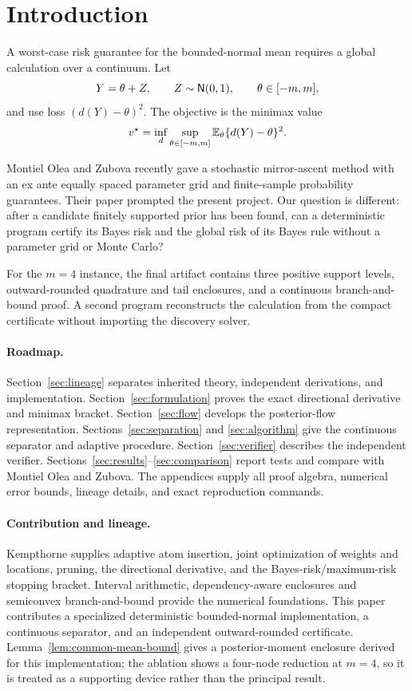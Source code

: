 \section{Introduction}
\label{sec:introduction}

A worst-case risk guarantee for the bounded-normal mean requires a global
calculation over a continuum. Let
\[
  Y=\theta+Z,\qquad Z\sim\mathsf N(0,1),\qquad \theta\in[-m,m],
\]
and use loss $(d(Y)-\theta)^2$.  The objective is the minimax value
\[
  v^\star=\inf_d\sup_{\theta\in[-m,m]}
    \mathbb E_\theta\{d(Y)-\theta\}^2 .
\]

Montiel Olea and Zubova \cite{montielzubova2026} recently gave a stochastic
mirror-ascent method with an ex ante equally spaced parameter grid and
finite-sample probability guarantees.  Their paper prompted the present
project.  Our question is different: after a candidate finitely supported
prior has been found, can a deterministic program certify its Bayes risk and
the global risk of its Bayes rule without a parameter grid or Monte Carlo?

For the $m=4$ instance, the final
artifact contains three positive support levels, outward-rounded
quadrature and tail enclosures, and a continuous branch-and-bound proof.
A second program reconstructs the calculation from the compact certificate
without importing the discovery solver.

\paragraph{Roadmap.}
Section~\ref{sec:lineage} separates inherited theory, independent derivations,
and implementation.  Section~\ref{sec:formulation} proves the exact
directional derivative and minimax bracket.  Section~\ref{sec:flow} develops
the posterior-flow representation.  Sections~\ref{sec:separation} and
\ref{sec:algorithm} give the continuous separator and adaptive procedure.
Section~\ref{sec:verifier} describes the independent verifier.
Sections~\ref{sec:results}--\ref{sec:comparison} report tests and compare with
Montiel Olea and Zubova.  The appendices supply all proof algebra, numerical
error bounds, lineage details, and exact reproduction commands.

\paragraph{Contribution and lineage.}
Kempthorne \cite{kempthorne1987} supplies adaptive atom insertion, joint
optimization of weights and locations, pruning, the directional derivative,
and the Bayes-risk/maximum-risk stopping bracket.  Interval arithmetic,
dependency-aware enclosures and semiconvex branch-and-bound provide the
numerical foundations.  This paper contributes a specialized deterministic
bounded-normal implementation, a continuous separator, and an independent
outward-rounded certificate.  Lemma~\ref{lem:common-mean-bound} gives a
posterior-moment enclosure derived for this implementation; the ablation shows
a four-node reduction at $m=4$, so it is treated as a supporting device rather
than the principal result.
